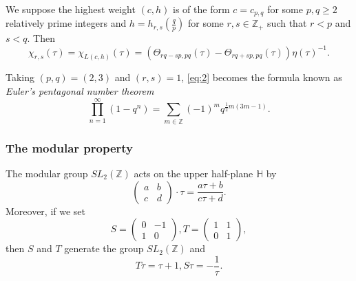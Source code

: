 \documentclass{beamer}
\begin{document}
\begin{frame}
  \begin{theorem}
    \label{thr:3}
    We suppose the highest weight $(c, h)$ is of the form $c = c_{p, q}$ for some $p, q \ge 2$ relatively prime integers and $h = h_{r, s}(\frac{q}{p})$ for some $r, s \in \mathbb{Z}_+$ such that $r < p$ and $s < q$.
    Then
    \begin{equation}
      \label{eq:2}
      \chi_{r, s}(\tau) = \chi_{L(c, h)}(\tau) = (\Theta_{rq - sp, pq}(\tau) - \Theta_{rq + sp, pq}(\tau))\eta(\tau)^{-1}.
    \end{equation}
  \end{theorem}

  \begin{corollary}
    \label{crl:1}
    Taking $(p, q) = (2, 3)$ and $(r, s) = 1$, \eqref{eq:2} becomes the formula known as \emph{Euler's pentagonal number theorem}
    \begin{equation*}
      \prod_{n = 1}^\infty(1 - q^n) = \sum_{m \in \mathbb{Z}}(-1)^mq^{\frac{1}{2}m(3m - 1)}.
    \end{equation*}
  \end{corollary}
\end{frame}

\begin{frame}
  \frametitle{The modular property}
  The modular group $SL_2(\mathbb{Z})$ acts on the upper half-plane $\mathbb{H}$ by
  \begin{equation*}
    \begin{pmatrix}
      a & b \\ c & d
    \end{pmatrix}
    \cdot \tau = \frac{a\tau + b}{c\tau + d}.
  \end{equation*}
  Moreover, if we set
  \begin{equation*}
    S =
    \begin{pmatrix}
      0 & -1 \\ 1 & 0
    \end{pmatrix},
    T =
    \begin{pmatrix}
      1 & 1 \\ 0 & 1
    \end{pmatrix},
  \end{equation*}
  then $S$ and $T$ generate the group $SL_2(\mathbb{Z})$ and
  \begin{equation*}
    T\tau = \tau + 1, S\tau = -\frac{1}{\tau}.
  \end{equation*}
\end{frame}
\end{document}
